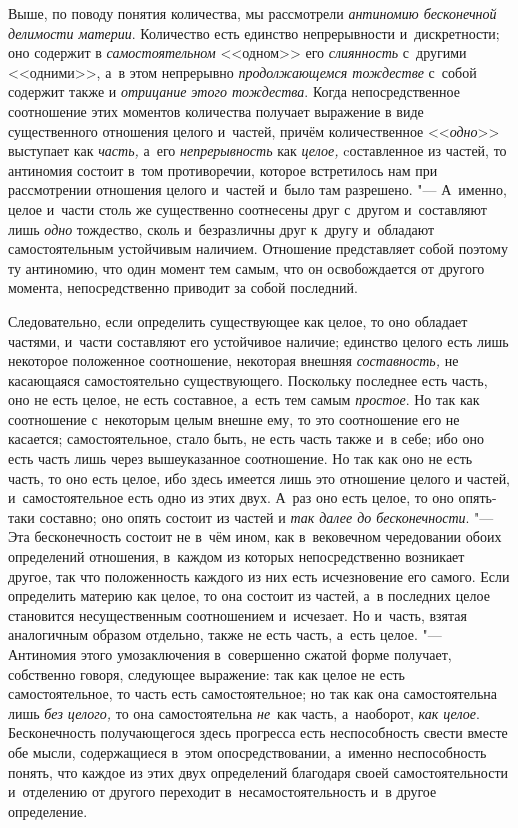 
Выше, по поводу понятия количества, мы рассмотрели
{\em антиномию бесконечной делимости материи}.
Количество есть единство непрерывности и~дискретности; оно содержит в
{\em самостоятельном} <<одном>> его
{\em слиянность} с~другими <<одними>>, а~в этом
непрерывно {\em продолжающемся тождестве} с~собой
содержит также и {\em отрицание этого тождества}. Когда
непосредственное соотношение этих моментов количества получает выражение в
виде существенного отношения целого и~частей, причём количественное
<<{\em одно}>> выступает как {\em часть,} а~его
{\em непрерывность} как {\em целое,} cоставленное из частей, то антиномия
состоит в~том противоречии, которое встретилось нам при рассмотрении
отношения целого и~частей и~было там разрешено. "--- А~именно, целое и~части
столь же существенно соотнесены друг с~другом и~составляют лишь
{\em одно} тождество, сколь и~безразличны друг к~другу
и~обладают самостоятельным устойчивым наличием. Отношение представляет
собой поэтому ту антиномию, что один момент тем самым, что он освобождается
от другого момента, непосредственно приводит за собой последний.

Следовательно, если определить существующее как целое, то оно обладает
частями, и~части составляют его устойчивое наличие; единство целого есть
лишь некоторое положенное соотношение, некоторая внешняя
{\em составность,} не касающаяся самостоятельно
существующего. Поскольку последнее есть часть, оно не есть целое, не есть
составное, а~есть тем самым {\em простое}. Но так как
соотношение с~некоторым целым внешне ему, то это соотношение его не
касается; самостоятельное, стало быть, не есть часть также и~в себе; ибо
оно есть часть лишь через вышеуказанное соотношение. Но так как оно не есть
часть, то оно есть целое, ибо здесь имеется лишь это отношение целого и
частей, и~самостоятельное есть одно из этих двух. А~раз оно есть целое,
то оно опять-таки составно; оно опять состоит из частей и
{\em так далее до бесконечности}. "--- Эта бесконечность
состоит не в~чём ином, как в~вековечном чередовании обоих определений
отношения, в~каждом из которых непосредственно возникает другое, так что
положенность каждого из них есть исчезновение его самого. Если определить
материю как целое, то она состоит из частей, а~в последних целое становится
несущественным соотношением и~исчезает. Но и~часть, взятая аналогичным
образом отдельно, также не есть часть, а~есть целое. "--- Антиномия этого
умозаключения в~совершенно сжатой форме получает, собственно говоря,
следующее выражение: так как целое не есть самостоятельное, то часть есть
самостоятельное; но так как она самостоятельна лишь
{\em без целого,} то она самостоятельна
{\em не}~как часть, а~наоборот,
{\em как целое}. Бесконечность получающегося здесь
прогресса есть неспособность свести вместе обе мысли, содержащиеся в~этом
опосредствовании, а~именно неспособность понять, что каждое из этих двух
определений благодаря своей самостоятельности и~отделению от другого
переходит в~несамостоятельность и~в другое определение.


